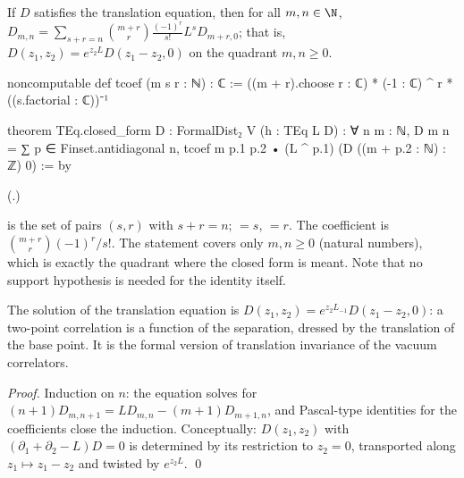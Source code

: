 \begin{theorem}\label{ch10:thm:closedform}
If $D$ satisfies the translation equation, then for all $m,n\in\N$,
$D_{m,n}=\sum_{s+r=n}\binom{m+r}{r}\frac{(-1)^r}{s!}L^sD_{m+r,0}$; that is,
$D(z_1,z_2)=e^{z_2L}D(z_1-z_2,0)$ on the quadrant $m,n\ge0$.
\end{theorem}
\begin{leancode}
noncomputable def tcoef (m s r : ℕ) : ℂ :=
  ((m + r).choose r : ℂ) * (-1 : ℂ) ^ r * ((s.factorial : ℂ))⁻¹

theorem TEq.closed_form {D : FormalDist₂ V} (h : TEq L D) :
    ∀ n m : ℕ, D m n = ∑ p ∈ Finset.antidiagonal n,
      tcoef m p.1 p.2 • (L ^ p.1) (D ((m + p.2 : ℕ) : ℤ) 0) := by
\end{leancode}
(.)
\begin{dictionary}
 is the set of pairs $(s,r)$ with $s+r=n$; $=s$,
$=r$.  The coefficient  is $\binom{m+r}r(-1)^r/s!$.  The statement
covers only $m,n\ge0$ (natural numbers), which is exactly the quadrant where the closed form is
meant.  Note that no support hypothesis is needed for the identity itself.
\end{dictionary}

\begin{physics}
The solution of the translation equation is $D(z_1,z_2)=e^{z_2L_{-1}}D(z_1-z_2,0)$: a two-point correlation is a function of the separation, dressed by the translation of the base point. It is the formal version of translation invariance of the vacuum correlators.
\end{physics}

\emph{Proof.} Induction on $n$: the equation solves for $(n+1)D_{m,n+1}=LD_{m,n}-(m+1)D_{m+1,n}$,
and Pascal-type identities for the coefficients close the induction.  Conceptually: $D(z_1,z_2)$
with $(\partial_1+\partial_2-L)D=0$ is determined by its restriction to $z_2=0$, transported along
$z_1\mapsto z_1-z_2$ and twisted by $e^{z_2L}$. \qed

